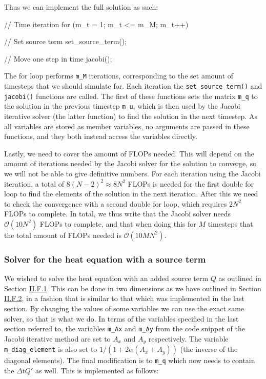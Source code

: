 \documentclass[reprint,english,notitlepage]{revtex4-1}  %
\begin{document}
Thus we can implement the full solution as such:

\begin{cpp}
// Time iteration
for (m_t = 1; m_t <= m_M; m_t++){
  // Set source term
  set_source_term();

  // Move one step in time
  jacobi();
}
\end{cpp}

The for loop performs \verb+m_M+ iterations, corresponding to the set amount of timesteps that we should simulate for. Each iteration the \verb+set_source_term()+ and \verb+jacobi()+ functions are called. The first of these functions sets the matrix \verb+m_q+ to the solution in the previous timestep \verb+m_u+, which is then used by the Jacobi iterative solver (the latter function) to find the solution in the next timestep. As all variables are stored as member variables, no arguments are passed in these functions, and they both instead access the variables directly. 

Lastly, we need to cover the amount of FLOPs needed. This will depend on the amount of iterations needed by the Jacobi solver for the solution to converge, so we will not be able to give definitive numbers. For each iteration using the Jacobi iteration, a total of $8(N-2)^2 \approx 8N^2$ FLOPs is needed for the first double for loop to find the elements of the solution in the next iteration. After this we need to check the convergence with a second double for loop, which requires $2N^2$ FLOPs to complete. In total, we thus write that the Jacobi solver needs $\mathcal{O}(10N^2)$ FLOPs to complete, and that when doing this for $M$ timesteps that the total amount of FLOPs needed is $\mathcal{O}(10MN^2)$. 

\subsubsection{Solver for the heat equation with a source term} \label{sec:method_heat_solver}

We wished to solve the heat equation with an added source term $Q$ as outlined in Section \hyperref[sec:formalism_heat_source_model]{II.F.1}. This can be done in two dimensions as we have outlined in Section \hyperref[sec:formalism_heat_eq_with_source_numerical_sol]{II.F.2}, in a fashion that is similar to that which was implemented in the last section. By changing the values of some variables we can use the exact same solver, so that is what we do. In terms of the variables specified in the last section referred to, the variables \verb+m_Ax+ and \verb+m_Ay+ from the code snippet of the Jacobi iterative method are set to $A_x$ and $A_y$ respectively. The variable \verb+m_diag_element+ is also set to $1/(1+ 2\alpha(A_x + A_y))$ (the inverse of the diagonal elements). The final modification is to \verb+m_q+ which now needs to contain the $\Delta t Q'$ as well. This is implemented as follows:
\end{document}
